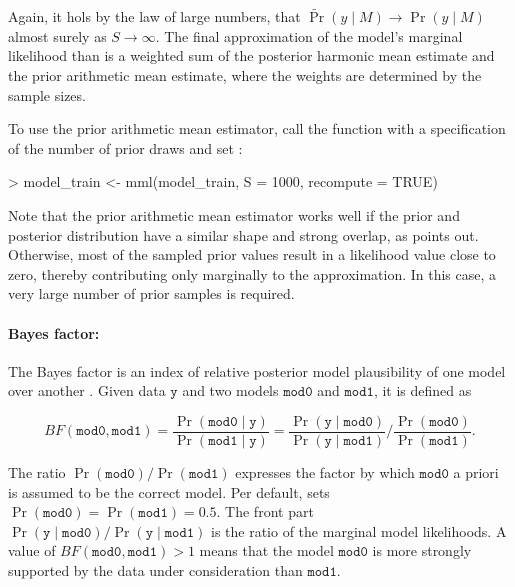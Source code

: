 \documentclass[article]{jss}
\newcommand{\fct}[1]{\code{#1()}}
\begin{document}
Again, it hols by the law of large numbers, that $\tilde{\Pr}(y\mid M) \to \Pr(y\mid M)$ almost surely as $S \to \infty$. The final approximation of the model's marginal likelihood than is a weighted sum of the posterior harmonic mean estimate and the prior arithmetic mean estimate, where the weights are determined by the sample sizes.

To use the prior arithmetic mean estimator, call the \fct{mml} function with a specification of the number of prior draws  and set :

\begin{Schunk}
\begin{Sinput}
> model_train <- mml(model_train, S = 1000, recompute = TRUE)
\end{Sinput}
\end{Schunk}

Note that the prior arithmetic mean estimator works well if the prior and posterior distribution have a similar shape and strong overlap, as \cite{Gronau:2017} points out. Otherwise, most of the sampled prior values result in a likelihood value close to zero, thereby contributing only marginally to the approximation. In this case, a very large number  of prior samples is required.

\paragraph{Bayes factor:}

The Bayes factor is an index of relative posterior model plausibility of one model over another \citep{Marin:2014}. Given data $\texttt{y}$ and two models $\texttt{mod0}$ and $\texttt{mod1}$, it is defined as

$$
BF(\texttt{mod0},\texttt{mod1}) = \frac{\Pr(\texttt{mod0} \mid \texttt{y})}{\Pr(\texttt{mod1} \mid \texttt{y})} = \frac{\Pr(\texttt{y} \mid \texttt{mod0} )}{\Pr(\texttt{y} \mid \texttt{mod1})} / \frac{\Pr(\texttt{mod0})}{\Pr(\texttt{mod1})}.
$$

The ratio $\Pr(\texttt{mod0}) / \Pr(\texttt{mod1})$ expresses the factor by which $\texttt{mod0}$ a priori is assumed to be the correct model. Per default,  sets $\Pr(\texttt{mod0}) = \Pr(\texttt{mod1}) = 0.5$. The front part $\Pr(\texttt{y} \mid \texttt{mod0} ) / \Pr(\texttt{y} \mid \texttt{mod1})$ is the ratio of the marginal model likelihoods. A value of $BF(\texttt{mod0},\texttt{mod1}) > 1$ means that the model $\texttt{mod0}$ is more strongly supported by the data under consideration than $\texttt{mod1}$.
\end{document}
